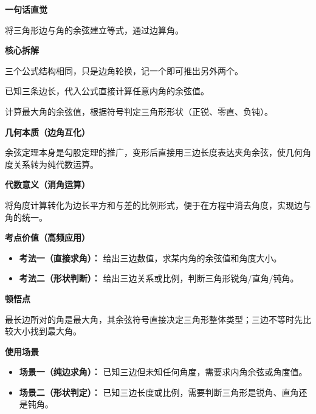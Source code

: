 \begin{explanationbox}
	\textbf{\textcolor{CExplanation}{一句话直觉}}

	将三角形边与角的余弦建立等式，通过边算角。

	\medskip
	\textbf{\textcolor{CExplanation}{核心拆解}}
	\begin{description}[style=nextline, leftmargin=2.8em, labelsep=0.5em, itemsep=0.45em]
		\item[\textbf{要点一（公式轮换）：}] 三个公式结构相同，只是边角轮换，记一个即可推出另外两个。
		\item[\textbf{要点二（三边求角）：}] 已知三条边长，代入公式直接计算任意内角的余弦值。
		\item[\textbf{要点三（判形标准）：}] 计算最大角的余弦值，根据符号判定三角形形状（正锐、零直、负钝）。
	\end{description}

	\medskip
	\textbf{\textcolor{CExplanation}{几何本质（边角互化）}}

	余弦定理本身是勾股定理的推广，变形后直接用三边长度表达夹角余弦，使几何角度关系转为纯代数运算。

	\medskip
	\textbf{\textcolor{CExplanation}{代数意义（消角运算）}}

	将角度计算转化为边长平方和与差的比例形式，便于在方程中消去角度，实现边与角的统一。

	\medskip
	\textbf{\textcolor{CExplanation}{考点价值（高频应用）}}
	\begin{itemize}[leftmargin=*, itemsep=0.5em, topsep=0.4em]
		\item \textbf{考法一（直接求角）：} 给出三边数值，求某内角的余弦值和角度大小。
		\item \textbf{考法二（形状判断）：} 给出三边关系或比例，判断三角形锐角/直角/钝角。
	\end{itemize}

	\medskip
	\textbf{\textcolor{CExplanation}{顿悟点}}

	最长边所对的角是最大角，其余弦符号直接决定三角形整体类型；三边不等时先比较大小找到最大角。

	\medskip
	\textbf{\textcolor{CExplanation}{使用场景}}
	\begin{itemize}[leftmargin=*, itemsep=0.5em, topsep=0.4em]
		\item \textbf{场景一（纯边求角）：} 已知三边但未知任何角度，需要求内角余弦或角度值。
		\item \textbf{场景二（形状判定）：} 已知三边长度或比例，需要判断三角形是锐角、直角还是钝角。
	\end{itemize}
\end{explanationbox}

